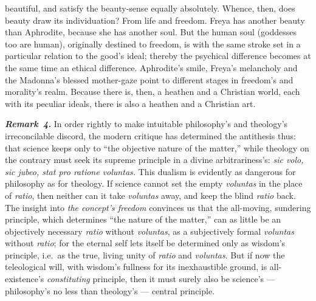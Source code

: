 \documentclass[12pt]{book}
\newcommand{\anm}[1]{\emph{\textbf{Remark~#1.}}}
\begin{document}
beautiful, and satisfy the beauty-sense equally absolutely. Whence, then,
does beauty draw its individuation? From life and freedom. Freya has another
beauty than Aphrodite, because she has another soul. But the human soul
(goddesses too are human), originally destined to freedom, is with the same
stroke set in a particular relation to the good's ideal; thereby the
psychical difference becomes at the same time an ethical difference.
Aphrodite's smile, Freya's melancholy and the Madonna's blessed mother-gaze
point to different stages in freedom's and morality's realm. Because there
is, then, a heathen and a Christian world, each with its peculiar ideals,
there is also a heathen and a Christian art.

\anm{4} In order rightly to make intuitable philosophy's and theology's
irreconcilable discord, the modern critique has determined the antithesis
thus: that science keeps only to ``the objective nature of the matter,''
while theology on the contrary must seek its supreme principle in a divine
arbitrariness's: \textit{sic volo, sic jubeo, stat pro ratione voluntas.}
This dualism is evidently as dangerous for philosophy as for theology. If
science cannot set the empty \textit{voluntas} in the place of
\textit{ratio}, then neither can it take \textit{voluntas} away, and keep
the blind \textit{ratio} back. The insight into \emph{the concept's
freedom} convinces us that the all-moving, sundering principle, which
determines ``the nature of the matter,'' can as little be an objectively
necessary \textit{ratio} without \textit{voluntas}, as a subjectively formal
\textit{voluntas} without \textit{ratio}; for the eternal self lets itself
be determined only as wisdom's principle, i.e.\ as the true, living unity of
\textit{ratio} and \textit{voluntas}. But if now the teleological will, with
wisdom's fullness for its inexhaustible ground, is all-existence's
\textit{constituting} principle, then it must surely also be science's ---
philosophy's no less than theology's --- central principle.
\end{document}
